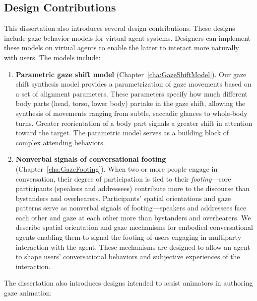 \subsection{Design Contributions}

This dissertation also introduces several design contributions. These designs include gaze behavior models for virtual agent systems. Designers can implement these models on virtual agents to enable the latter to interact more naturally with users. The models include:

\begin{enumerate}
\item \textbf{Parametric gaze shift model} (Chapter~\ref{cha:GazeShiftModel}). Our gaze shift synthesis model provides a parametrization of gaze movements based on a set of alignment parameters. These parameters specify how much different body parts (head, torso, lower body) partake in the gaze shift, allowing the synthesis of movements ranging from subtle, saccadic glances to whole-body turns. Greater reorientation of a body part signals a greater shift in attention toward the target. The parametric model serves as a building block of complex attending behaviors.
\item \textbf{Nonverbal signals of conversational footing} (Chapter~\ref{cha:GazeFooting}). When two or more people engage in conversation, their degree of participation is tied to their \emph{footing}---core participants (speakers and addressees) contribute more to the discourse than bystanders and overhearers. Participants' spatial orientations and gaze patterns serve as nonverbal signals of footing---speakers and addressees face each other and gaze at each other more than bystanders and overhearers. We describe spatial orientation and gaze mechanisms for embodied conversational agents enabling them to signal the footing of users engaging in multiparty interaction with the agent. These mechanisms are designed to allow an agent to shape users' conversational behaviors and subjective experiences of the interaction.
\end{enumerate}

The dissertation also introduces designs intended to assist animators in authoring gaze animation:

